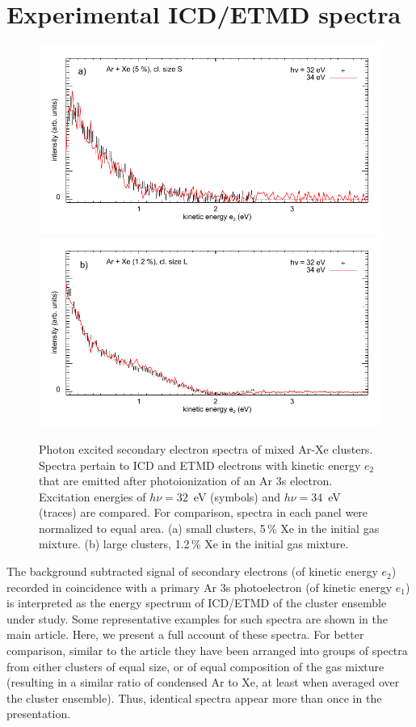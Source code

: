 \documentclass[journal=jpccck,manuscript=suppinfo]{achemso}
\begin{document}
\section{Experimental ICD/ETMD spectra}
%
\begin{figure}
 \centering
 \includegraphics[width=13.12cm]{pics/630_631_cs.pdf}
 \includegraphics[width=13.12cm]{pics/673_674_cs.pdf}
 \caption{
Photon excited secondary electron spectra of mixed Ar-Xe clusters.
Spectra pertain to ICD and ETMD electrons with kinetic energy $e_2$ that are emitted after photoionization of an Ar 3s electron.
Excitation energies of $h\nu = 32$~eV (symbols) and $h\nu = 34$~eV (traces) are compared.
For comparison, spectra in each panel were normalized to equal area. 
(a) small clusters, 5\,\% Xe in the initial gas mixture.
(b) large clusters, 1.2\,\% Xe in the initial gas mixture.
 \label{figure:hnucomp}
 }
\end{figure}
%
The background subtracted signal of secondary electrons (of kinetic energy $e_2$) recorded in coincidence with a primary Ar 3s photoelectron (of kinetic energy $e_1$) is interpreted as the energy spectrum of ICD/ETMD of the cluster ensemble under study.
Some representative examples for such spectra are shown in the main article.
Here, we present a full account of these spectra.
For better comparison, similar to the article they have been arranged into groups of spectra from either clusters of equal size, or of equal composition of the gas mixture (resulting in a similar ratio of condensed Ar to Xe, at least when averaged over the cluster ensemble).
Thus, identical spectra appear more than once in the presentation.
\end{document}
